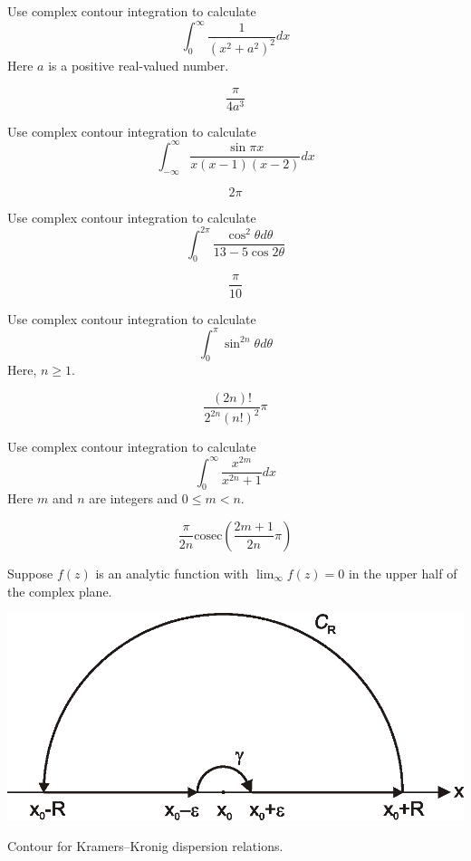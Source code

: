 \begin{exer}
Use complex contour integration to calculate
$$ \int_0^{\infty} \frac{1}{\left(x^2 + a^2\right)^2} dx$$
Here $a$ is a positive real-valued number.
\begin{sol}
$$\frac{\pi}{4 a^3}$$
\end{sol}
\end{exer}

\begin{exer}
Use complex contour integration to calculate
$$ \int_{-\infty}^{\infty} \frac{\sin \pi x}{x (x-1) (x-2)} dx$$
\begin{sol}
$$2 \pi$$
\end{sol}
\end{exer}

\begin{exer}
Use complex contour integration to calculate
$$ \int_0^{2\pi} \frac{\cos^2 \theta d \theta}{13-5\cos 2 \theta}$$
\begin{sol}
$$\frac{\pi}{10}$$
\end{sol}
\end{exer}

\begin{exer}
Use complex contour integration to calculate
$$ \int_0^\pi \sin^{2n} \theta d \theta$$
Here, $n \ge 1$.
\begin{sol}
$$\frac{(2n)!}{ 2^{2n}(n!)^2} \pi$$
\end{sol}
\end{exer}

\begin{exer}
Use complex contour integration to calculate
$$ \int_0^\infty \frac{x ^ {2m}}{x^{2n} + 1} dx$$
Here $m$ and $n$ are integers and $0 \le m < n$.
\begin{sol}
$$\frac{\pi}{2n} \mathrm{cosec} \left( \frac{2m+1}{2n} \pi \right)$$
\end{sol}
\end{exer}


\pagebreak



Suppose $f(z)$ is an analytic function with $\lim_\infty f(z) = 0$ in the upper half of the complex plane.

\begin{marginfigure}[-0.5cm]
\centering
\includegraphics{complex/figures/kk}
\caption{Contour for Kramers--Kronig dispersion relations.}
\label{fig-KK}
\end{marginfigure}


